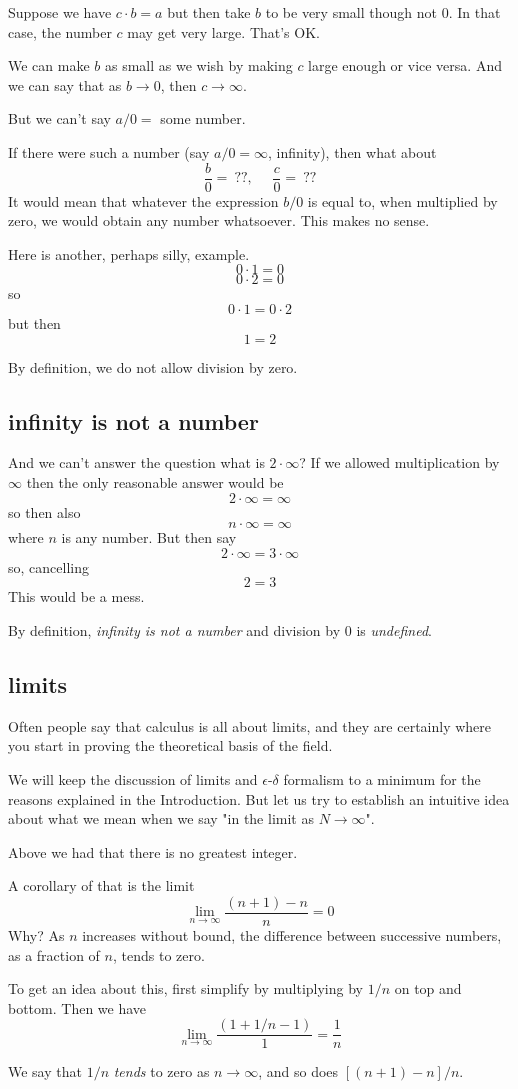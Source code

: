 \documentclass[11pt, oneside]{article}
\begin{document}
Suppose we have $c \cdot b = a$ but then take $b$ to be very small though not 0.  In that case, the number $c$ may get very large.  That's OK.  

We can make $b$ as small as we wish by making $c$ large enough or vice versa.  And we can say that as $b \rightarrow 0$, then $c \rightarrow \infty$.

But we can't say $a/0 = $ some number.

If there were such a number (say $a/0 = \infty$, infinity), then what about 
\[ \frac{b}{0} = \ ??, \ \ \ \ \ \ \frac{c}{0} = \ ??  \]
It would mean that whatever the expression $b/0$ is equal to, when multiplied by zero, we would obtain any number whatsoever.  This makes no sense.

Here is another, perhaps silly, example.
\[ 0 \cdot 1 = 0 \]
\[ 0 \cdot 2 = 0 \]
so
\[ 0 \cdot 1 = 0 \cdot 2 \]
but then
\[ 1 = 2 \]

By definition, we do not allow division by zero.

\subsection*{infinity is not a number}

And we can't answer the question what is $2 \cdot \infty$?  If we allowed multiplication by $\infty$ then the only reasonable answer would be
\[ 2 \cdot \infty = \infty \]
so then also
\[ n \cdot \infty = \infty \]
where $n$ is any number.  But then say
\[ 2 \cdot \infty = 3 \cdot \infty \]
so, cancelling
\[ 2 = 3 \]
This would be a mess.

By definition, \emph{infinity is not a number} and division by $0$ is \emph{undefined}.

\subsection*{limits}
Often people say that calculus is all about limits, and they are certainly where you start in proving the theoretical basis of the field.  

We will keep the discussion of limits and $\epsilon$-$\delta$ formalism to a minimum for the reasons explained in the Introduction.  But let us try to establish an intuitive idea about what we mean when we say "in the limit as $N \rightarrow \infty$".

Above we had that there is no greatest integer.

A corollary of that is the limit
\[ \lim_{n \rightarrow \infty} \frac{(n + 1) - n}{n} = 0 \]
Why?  As $n$ increases without bound, the difference between successive numbers, as a fraction of $n$, tends to zero.

To get an idea about this, first simplify by multiplying by $1/n$ on top and bottom.  Then we have
\[ \lim_{n \rightarrow \infty} \frac{(1 + 1/n - 1)}{1} = \frac{1}{n} \]

We say that $1/n$ \emph{tends} to zero as $n \rightarrow \infty$, and so does $[(n+1)-n]/n$.
\end{document}
